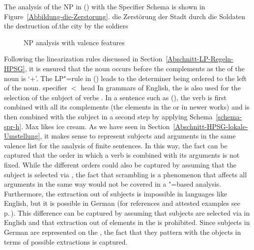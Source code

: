 The analysis of the NP in () with the Specifier Schema is shown in 
Figure~\vref{Abbildung-die-Zerstorung}.
\ea
\gll die Zerstörung der Stadt durch die Soldaten\\
	 the destruction of.the city by the soldiers\\
\z
\begin{figure}
\caption{NP analysis with valence features \spr}\label{Abbildung-die-Zerstorung} 
\end{figure}%
Following the linearization rules discussed in Section~\ref{Abschnitt-LP-Regeln-HPSG}, it is ensured that the noun occurs before the complements as the
\initialv of the noun is `+'. The LP"=rule in () leads to the determiner being ordered to the left of the noun.
\ea
specifier $<$ head
\z
%
%
In grammars of English, the \sprf is also used for the selection of the subject of verbs \citep*[Section~4.3]{SWB2003a}.
In a sentence such as (), the verb is first combined with all its complements (the elements in the \subcat or
\comps in newer works) and is then combined with the subject in a second step by applying Schema~\ref{schema-spr-h}.
\ea
Max likes ice cream.
\z
As we have seen in Section~\ref{Abschnitt-HPSG-lokale-Umstellung}, it makes sense to represent subjects and arguments in the same valence list
for the analysis of finite sentences. In this way, the fact can be captured that the order in which a verb is combined with its arguments is not
fixed. While the different orders could also be captured by assuming that the subject is selected
via \spr, the fact that scrambling is a phenomenon that affects all arguments in the same way would
not be covered in a \spr"=based analysis. Furthermore, the extraction out of subjects is impossible
in languages like English, but it is possible in German (for references and attested examples see p.\,\pageref{page-extraction-out-of-subjects}). This difference can be captured by assuming
that subjects are selected via \spr in English and that extraction out of elements in the \sprl is
prohibited. Since subjects in German are represented on the \compsl, the fact that they pattern with
the objects in terms of possible extractions is captured.

